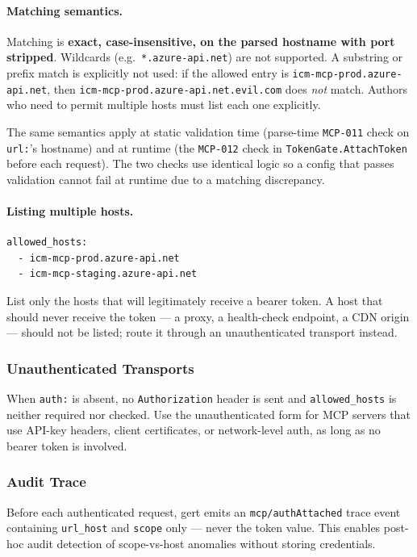 \paragraph{Matching semantics.}
Matching is \textbf{exact, case-insensitive, on the parsed hostname with port
stripped}.  Wildcards (e.g.\ \texttt{*.azure-api.net}) are not supported.  A
substring or prefix match is explicitly not used: if the allowed entry is
\texttt{icm-mcp-prod.azure-api.net}, then
\texttt{icm-mcp-prod.azure-api.net.evil.com} does \emph{not} match.  Authors
who need to permit multiple hosts must list each one explicitly.

The same semantics apply at static validation time (parse-time \texttt{MCP-011}
check on \texttt{url:}'s hostname) and at runtime (the \texttt{MCP-012} check
in \texttt{TokenGate.AttachToken} before each request).  The two checks use
identical logic so a config that passes validation cannot fail at runtime due
to a matching discrepancy.

\paragraph{Listing multiple hosts.}
\begin{verbatim}
allowed_hosts:
  - icm-mcp-prod.azure-api.net
  - icm-mcp-staging.azure-api.net
\end{verbatim}

List only the hosts that will legitimately receive a bearer token.  A host
that should never receive the token --- a proxy, a health-check endpoint, a
CDN origin --- should not be listed; route it through an unauthenticated
transport instead.

\subsubsection{Unauthenticated Transports}

When \texttt{auth:} is absent, no \texttt{Authorization} header is sent and
\texttt{allowed\_hosts} is neither required nor checked.  Use the
unauthenticated form for MCP servers that use API-key headers, client
certificates, or network-level auth, as long as no bearer token is involved.

\subsubsection{Audit Trace}

Before each authenticated request, gert emits an \texttt{mcp/authAttached}
trace event containing \texttt{url\_host} and \texttt{scope} only --- never
the token value.  This enables post-hoc audit detection of scope-vs-host
anomalies without storing credentials.

